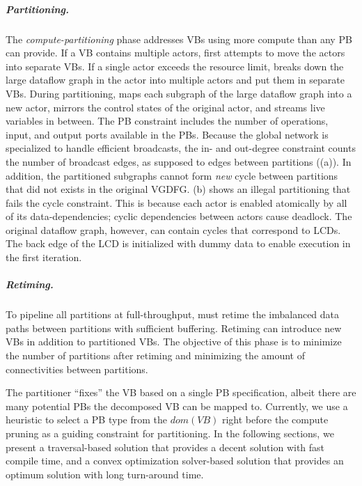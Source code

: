 \subparagraph{Partitioning.}
The {\em compute-partitioning} phase addresses VBs using more compute than any PB can provide. 
If a VB contains multiple actors, \name{} first attempts to move the actors into separate VBs.
If a single actor exceeds the resource limit, \name{} breaks down the large dataflow graph in the actor into multiple actors and put them in separate VBs.
During partitioning, \name{} maps each subgraph of the large dataflow graph into a new actor, mirrors the control states of the original actor, and streams live variables in between.
The PB constraint includes the number of operations, input, and output ports available in the PBs.
Because the global network is specialized to handle efficient broadcasts, the in- and out-degree constraint counts the number of broadcast edges, as supposed to edges between partitions ((a)).
In addition, the partitioned subgraphs cannot form {\em new} cycle between partitions that did not exists in the original VGDFG. 
 (b) shows an illegal partitioning that fails the cycle constraint.
This is because each actor is enabled atomically by all of its data-dependencies; cyclic dependencies between actors cause deadlock.
The original dataflow graph, however, can contain cycles that correspond to LCDs.
The back edge of the LCD is initialized with dummy data to enable execution in the first iteration.

\subparagraph{Retiming.}
To pipeline all partitions at full-throughput, \name{} must retime the imbalanced data paths between partitions with sufficient buffering. 
Retiming can introduce new VBs in addition to partitioned VBs.
The objective of this phase is to minimize the number of partitions after retiming and minimizing the amount of connectivities between partitions.

The partitioner ``fixes'' the VB based on a single PB specification, albeit there are many potential PBs the decomposed VB can be mapped to.
Currently, we use a heuristic to select a PB type from the $dom(VB)$ right before the compute pruning as a guiding constraint for partitioning.
In the following sections, we present a traversal-based solution that provides a decent solution with fast compile time, and a convex optimization solver-based solution that provides an optimum solution with long turn-around time.


